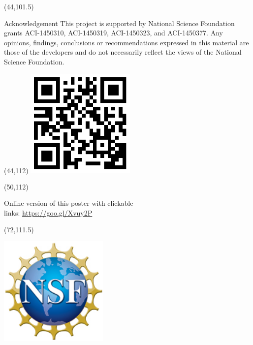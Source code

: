 \documentclass[final]{beamer}
\begin{document}
\begin{frame}{}
\begin{textblock}{38.0}(44,101.5)
\begin{block}{Acknowledgement}
This project is supported by National Science Foundation grants ACI-1450310, ACI-1450319, ACI-1450323, and ACI-1450377. Any opinions, findings, conclusions or recommendations expressed in this material are those of the developers and do not necessarily reflect the views of the National Science Foundation.
\end{block}
\end{textblock}



\begin{textblock}{10.0}(44,112)
\includegraphics[width=0.4\textwidth]{images/si2-2018-poster-qr.png}
\end{textblock}

\begin{textblock}{24.0}(50,112)
\begin{flushleft}
Online version of this poster with clickable \\
links: \href{https://goo.gl/Xvuy2P}{https://goo.gl/Xvuy2P}
\end{flushleft}
\end{textblock}

\begin{textblock}{10.0}(72,111.5)
\begin{flushright}
\includegraphics[width=0.4\textwidth]{images/nsf1.jpg}
\end{flushright}
\end{textblock}


\end{frame}
\end{document}
